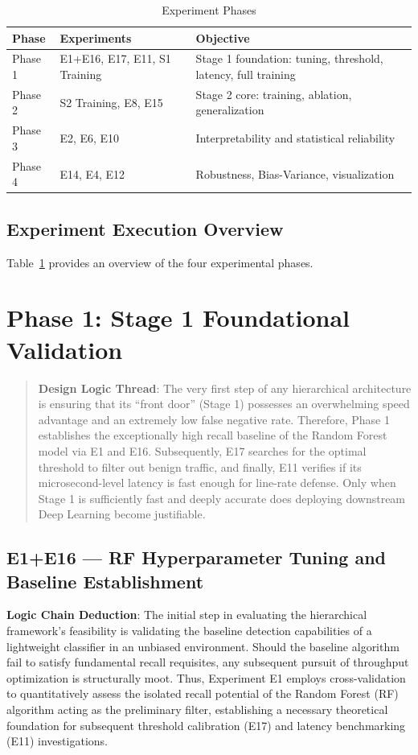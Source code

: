 \documentclass[sigconf]{acmart}
\begin{document}
\begin{table}[!t]
\caption{Experiment Phases}
\label{tab:experiments}
\begin{tabular}{p{1.5cm}p{5.5cm}p{9.0cm}}
\toprule
\textbf{Phase} & \textbf{Experiments} & \textbf{Objective} \\
\midrule
Phase 1 & E1+E16, E17, E11, S1 Training & Stage 1 foundation: tuning, threshold, latency, full training \\
Phase 2 & S2 Training, E8, E15 & Stage 2 core: training, ablation, generalization \\
Phase 3 & E2, E6, E10 & Interpretability and statistical reliability \\
Phase 4 & E14, E4, E12 & Robustness, Bias-Variance, visualization \\
\bottomrule
\end{tabular}
\end{table}

\subsection{Experiment Execution Overview} Table~\ref{tab:experiments} provides an overview of the four experimental phases.

\section{Phase 1: Stage 1 Foundational Validation}
\begin{quote}
\textbf{Design Logic Thread}: The very first step of any hierarchical architecture is ensuring that its ``front door'' (Stage 1) possesses an overwhelming speed advantage and an extremely low false negative rate. Therefore, Phase 1 establishes the exceptionally high recall baseline of the Random Forest model via E1 and E16. Subsequently, E17 searches for the optimal threshold to filter out benign traffic, and finally, E11 verifies if its microsecond-level latency is fast enough for line-rate defense. Only when Stage 1 is sufficiently fast and deeply accurate does deploying downstream Deep Learning become justifiable.
\end{quote}

\subsection{E1+E16 --- RF Hyperparameter Tuning and Baseline Establishment}
\textbf{Logic Chain Deduction}: The initial step in evaluating the hierarchical framework's feasibility is validating the baseline detection capabilities of a lightweight classifier in an unbiased environment. Should the baseline algorithm fail to satisfy fundamental recall requisites, any subsequent pursuit of throughput optimization is structurally moot. Thus, Experiment E1 employs cross-validation to quantitatively assess the isolated recall potential of the Random Forest (RF) algorithm acting as the preliminary filter, establishing a necessary theoretical foundation for subsequent threshold calibration (E17) and latency benchmarking (E11) investigations.
\end{document}
